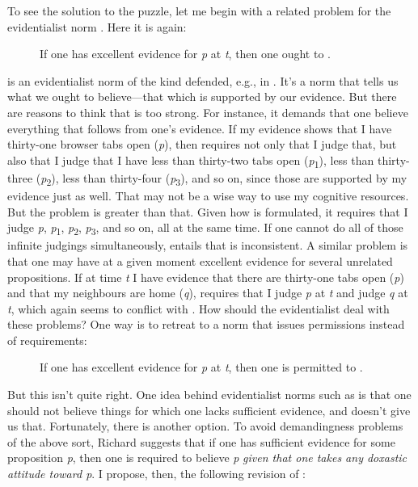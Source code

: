 \documentclass[12pt]{article}
\begin{document}
To see the solution to the puzzle, let me begin with a related problem for the evidentialist norm \eo{}. Here it is again:

\begin{description}
    \item[\eo] If one has excellent evidence for \textit{p} at \textit{t}, then one ought to \jud{}.
\end{description}
%
\eo{} is an evidentialist norm of the kind defended, e.g., in \textcite{feldman_evidentialism_1985}. It's a norm that tells us what we ought to believe---that which is supported by our evidence. But there are reasons to think that \eo{} is too strong. For instance, it demands that one believe everything that follows from one's evidence. If my evidence shows that I have thirty-one browser tabs open (\textit{p}), then \eo{} requires not only that I judge that, but also that I judge that I have less than thirty-two tabs open (\textit{p}\textsubscript{1}), less than thirty-three (\textit{p}\textsubscript{2}), less than thirty-four (\textit{p}\textsubscript{3}), and so on, since those are supported by my evidence just as well. That may not be a wise way to use my cognitive resources. But the problem is greater than that. Given how \eo{} is formulated, it requires that I judge \textit{p}, \textit{p}\textsubscript{1}, \textit{p}\textsubscript{2}, \textit{p}\textsubscript{3}, and so on, all at the same time. If one cannot do all of those infinite judgings simultaneously, \opic{} entails that \eo{} is inconsistent. A similar problem is that one may have at a given moment excellent evidence for several unrelated propositions. If at time \textit{t} I have evidence that there are thirty-one tabs open (\textit{p}) and that my neighbours are home (\textit{q}), \eo{} requires that I judge \textit{p} at \textit{t} and judge \textit{q} at \textit{t}, which again seems to conflict with \opic{}. How should the evidentialist deal with these problems? One way is to retreat to a norm that issues permissions instead of requirements:

\begin{description}
    \item[\ep] If one has excellent evidence for \textit{p} at \textit{t}, then one is permitted to \jud{}.
\end{description}
%
But this isn't quite right. One idea behind evidentialist norms such as \eo{} is that one should not believe things for which one lacks sufficient evidence, and \ep{} doesn't give us that. Fortunately, there is another option. To avoid demandingness problems of the above sort, Richard \textcite{feldman_ethics_2000} suggests that if one has sufficient evidence for some proposition \textit{p}, then one is required to believe \textit{p} \textit{given that one takes any doxastic attitude toward p}. I propose, then, the following revision of \eo{}:
\end{document}
